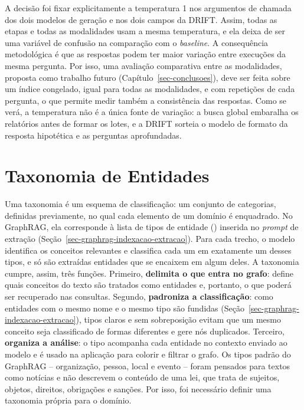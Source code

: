 A decisão foi fixar explicitamente a temperatura 1 nos argumentos de chamada dos dois modelos de geração e nos dois campos da DRIFT. Assim, todas as etapas e todas as modalidades usam a mesma temperatura, e ela deixa de ser uma variável de confusão na comparação com o \textit{baseline}. A consequência metodológica é que as respostas podem ter maior variação entre execuções da mesma pergunta. Por isso, uma avaliação comparativa entre as modalidades, proposta como trabalho futuro (Capítulo~\ref{sec-conclusoes}), deve ser feita sobre um índice congelado, igual para todas as modalidades, e com repetições de cada pergunta, o que permite medir também a consistência das respostas. Como se verá, a temperatura não é a única fonte de variação: a busca global embaralha os relatórios antes de formar os lotes, e a DRIFT sorteia o modelo de formato da resposta hipotética e as perguntas aprofundadas.

\section{Taxonomia de Entidades}
\label{sec-indexacao-taxonomia}

Uma taxonomia é um esquema de classificação: um conjunto de categorias, definidas previamente, no qual cada elemento de um domínio é enquadrado. No GraphRAG, ela corresponde à lista de tipos de entidade () inserida no \textit{prompt} de extração (Seção~\ref{sec-graphrag-indexacao-extracao}). Para cada trecho, o modelo identifica os conceitos relevantes e classifica cada um em exatamente um desses tipos, e só são extraídas entidades que se encaixem em algum deles. A taxonomia cumpre, assim, três funções. Primeiro, \textbf{delimita o que entra no grafo}: define quais conceitos do texto são tratados como entidades e, portanto, o que poderá ser recuperado nas consultas. Segundo, \textbf{padroniza a classificação}: como entidades com o mesmo nome e o mesmo tipo são fundidas (Seção~\ref{sec-graphrag-indexacao-extracao}), tipos claros e sem sobreposição evitam que um mesmo conceito seja classificado de formas diferentes e gere nós duplicados. Terceiro, \textbf{organiza a análise}: o tipo acompanha cada entidade no contexto enviado ao modelo e é usado na aplicação para colorir e filtrar o grafo. Os tipos padrão do GraphRAG -- organização, pessoa, local e evento -- foram pensados para textos como notícias e não descrevem o conteúdo de uma lei, que trata de sujeitos, objetos, direitos, obrigações e sanções. Por isso, foi necessário definir uma taxonomia própria para o domínio.

